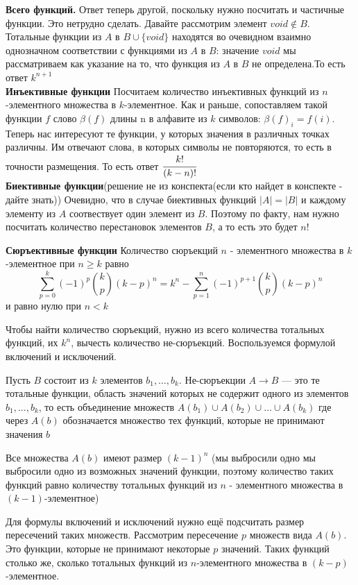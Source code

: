 \documentclass[a4paper, 10pt]{article}
\begin{document}
\textbf{Всего функций.} Ответ теперь другой, поскольку нужно посчитать и частичные функции. Это нетрудно сделать. Давайте рассмотрим элемент $void \not\in B$. Тотальные функции из $A$ в $B \cup \{void\}$ находятся во очевидном взаимно однозначном соответствии с функциями из $A$ в $B$: значение $void$ мы рассматриваем как указание на то, что функция из $A$ в $B$ не определена.То есть ответ $k^{n + 1}$ \\

\textbf{Инъективные функции} Посчитаем количество инъективных функций из $n$-элементного множества в $k$-элементное. Как и раньше, сопоставляем такой функции $f$ слово $\beta(f)$ длины n в алфавите из $k$ символов: $\beta(f)_i = f(i)$. Теперь нас интересуют те функции, у которых значения в различных точках различны. Им отвечают слова, в которых символы не повторяются, то есть в точности размещения. То есть ответ $\cfrac{k!}{(k - n)!}$ \\

\textbf{Биективные функции}(решение не из конспекта(если кто найдет в конспекте - дайте знать)) Очевидно, что в случае биективных функций $|A| = |B|$ и каждому элементу из $A$ соотвествует один элемент из $B$. Поэтому по факту, нам нужно посчитать количество перестановок элементов $B$, а то есть это будет $n!$

\textbf{Сюръективные функции} Количество сюръекций $n$ - элементного множества в $k$-элементное при $n \geqslant k$ равно $$\sum^{k}_{p=0}(-1)^p \binom{k}{p} (k - p)^n = k^n - \sum^{n}_{p=1}(-1)^{p+1} \binom{k}{p}(k - p)^n$$ и равно нулю при $n < k$

Чтобы найти количество сюръекций, нужно из всего количества тотальных функций, их $k^n$, вычесть количество не-сюръекций. Воспользуемся формулой включений и исключений.

Пусть $B$ состоит из $k$ элементов $b_1, \dots , b_k$. Не-сюръекции $A \to B$ — это те тотальные функции, область значений которых не содержит одного из элементов $b_1 , . . . , b_k$, то есть объединение множеств $A(b_1) \cup A(b_2) \cup \dots \cup A(b_k)$ где через $A(b)$ обозначается множество тех функций, которые не принимают значения $b$

Все множества $A(b)$ имеют размер $(k - 1)^n$ (мы выбросили одно мы выбросили одно из возможных значений функции, поэтому количество таких функций равно количеству тотальных функций из $n$ - элементного множества в $(k - 1)$-элементное)

Для формулы включений и исключений нужно ещё подсчитать размер пересечений таких множеств. Рассмотрим пересечение $p$ множеств вида $A(b)$. Это функции, которые не принимают некоторые $p$ значений. Таких функций столько же, сколько тотальных функций из $n$-элементного множества в $(k - p)$-элементное.
\end{document}
